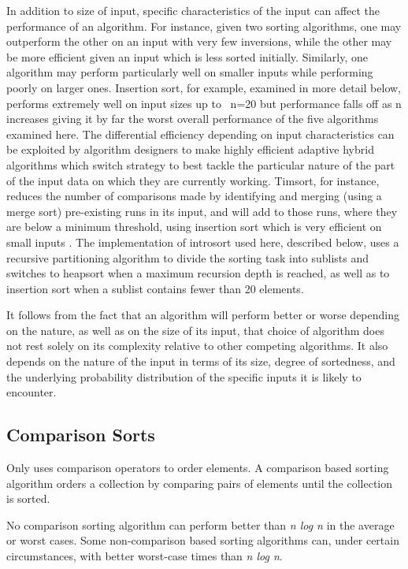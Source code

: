 \documentclass[12pt, a4paper]{article}
\begin{document}
In addition to size of input, specific characteristics of the input can affect the performance of an algorithm. For instance, given two sorting algorithms, one may outperform the other on an input with very few inversions, while the other may be more efficient given an input which is less sorted initially. Similarly, one algorithm may perform particularly well on smaller inputs while performing poorly on larger ones. Insertion sort, for example, examined in more detail below, performs extremely well on input sizes up to ~n=20 but performance falls off as n increases giving it by far the worst overall performance of the five algorithms examined here. The differential efficiency depending on input characteristics can be exploited by algorithm designers to make highly efficient adaptive hybrid algorithms which switch strategy to best tackle the particular nature of the part of the input data on which they are currently working. Timsort, for instance, reduces the number of comparisons made by identifying and merging (using a merge sort) pre-existing runs in its input, and will add to those runs, where they are below a minimum threshold, using insertion sort which is very efficient on small inputs \autocite{enwiki:997404113}. The implementation of introsort used here, described below, uses a recursive partitioning algorithm to divide the sorting task into sublists and switches to heapsort when a maximum recursion depth is reached, as well as to insertion sort when a sublist contains fewer than 20 elements.

It follows from the fact that an algorithm will perform better or worse depending on the nature, as well as on the size of its input, that choice of algorithm does not rest solely on its complexity relative to other competing algorithms. It also depends on the nature of the input in terms of its size, degree of sortedness, and the underlying probability distribution of the specific inputs it is likely to encounter.

\subsection{Comparison Sorts}

Only uses comparison operators to order elements. A comparison based sorting algorithm orders a collection by comparing pairs of elements until the collection is sorted.

No comparison sorting algorithm can perform better than \emph{n log n} in the average or worst cases. Some non-comparison based sorting algorithms can, under certain circumstances, with better worst-case times than \emph{n log n}.
\end{document}
